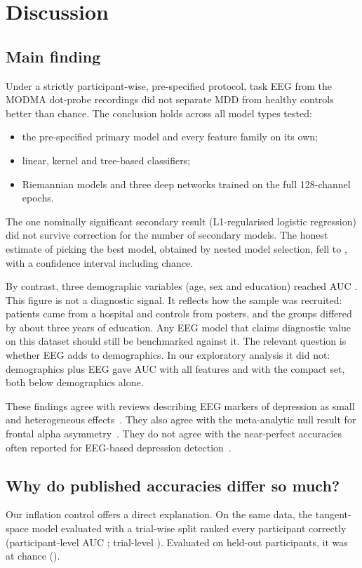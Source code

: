 \section{Discussion}

\subsection{Main finding}
Under a strictly participant-wise, pre-specified protocol, task EEG from the MODMA dot-probe recordings did not
separate MDD from healthy controls better than chance. The conclusion holds across all model types tested:
\begin{itemize}
  \item the pre-specified primary model and every feature family on its own;
  \item linear, kernel and tree-based classifiers;
  \item Riemannian models and three deep networks trained on the full 128-channel epochs.
\end{itemize}
The one nominally significant secondary result (L1-regularised logistic regression) did not survive correction for
the number of secondary models. The honest estimate of picking the best model, obtained by nested model selection,
fell to \NestedmodelselectionAllAuc, with a confidence interval including chance.

By contrast, three demographic variables (age, sex and education) reached AUC \DemographicsLrAuc. This figure is not
a diagnostic signal. It reflects how the sample was recruited: patients came from a hospital and controls from
posters, and the groups differed by about three years of education. Any EEG model that claims diagnostic value on this
dataset should still be benchmarked against it. The relevant question is whether EEG adds to demographics. In our
exploratory analysis it did not: demographics plus EEG gave AUC \AudDemoPlusEEGAllAuc{} with all features and
\AudDemoPlusCompactAuc{} with the compact set, both below demographics alone.

These findings agree with reviews describing EEG markers of depression as small and heterogeneous
effects~\cite{olbrich2013eeg,deaguiar2019review,simmatis2023technical}. They also agree with the meta-analytic null
result for frontal alpha asymmetry~\cite{vandervinne2017faa}. They do not agree with the near-perfect accuracies often
reported for EEG-based depression detection~\cite{ay2019automated}.

\subsection{Why do published accuracies differ so much?}
Our inflation control offers a direct explanation. On the same data, the tangent-space model evaluated with a
trial-wise split ranked every participant correctly (participant-level AUC \InflTsLrTrialSplitSubjectAuc;
trial-level \InflTsLrTrialSplitTrialAuc). Evaluated on held-out participants, it was at chance
(\InflTsLrSubjectSplitSubjectAuc).

